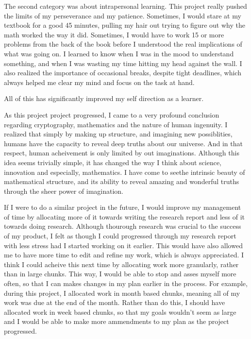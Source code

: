 \documentclass[12pt, a4paper, draft]{report}
\begin{document}
The second category was about intrapersonal learning. This project really
pushed the limits of my perseverance and my patience. Sometimes, I would
stare at my textbook for a good 45 minutes, pulling my hair out trying to
figure out why the math worked the way it did. Sometimes, I would have
to work 15 or more problems from the back of the book before I understood
the real implications of what was going on. I learned to know when I was
in the mood to understand something, and when I was wasting my time hitting
my head against the wall. I also realized the importance of occasional
breaks, despite tight deadlines, which always helped me clear my mind
and focus on the task at hand.

All of this has significantly improved my self direction as a learner.

As this project project progressed, I came to a very profound
conclusion regarding cryptography, mathematics and the nature of
human ingenuity. I realized that simply by making up structure, and
imagining new possiblities, humans have the capacity to reveal
deep truths about our universe. And in that respect, human acheivement
is only limited by out imaginations. Although this idea seems trivially
simple, it has changed the way I think about science, innovation and
especially, mathematics. I have come to seethe intrinsic beauty of
mathematical structure, and its ability to reveal amazing and wonderful
truths through the sheer power of imagination.

If I were to do a similar project in the future, I would improve my
management of time by allocating more of it towards writing the
research report and less of it towards doing research. Although
thourough research was crucial to the success of my product, I felt
as though I could progressed through my research report with less
stress had I started working on it earlier. This would have also
allowed me to have more time to edit and refine my work, which is
always appreciated. I think I could acheive this next time by allocating
work more granularly, rather than in large chunks. This way, I would
be able to stop and asses myself more often, so that I can makes
changes in my plan earlier in the process. For example, during
this project, I allocated work in month based chunks, meaning all
of my work was due at the end of the month. Rather than do this,
I should have allocated work in week based chunks, so that my
goals wouldn't seem as large and I would be able to make more
ammendments to my plan as the project progressed.
\end{document}
